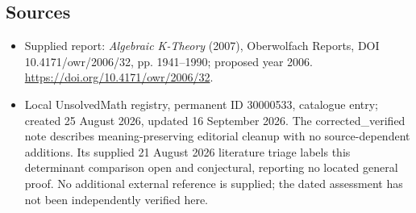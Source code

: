 \documentclass[11pt]{article}
\begin{document}
\subsection{Sources}
\begin{itemize}
\item Supplied report: \emph{Algebraic K-Theory} (2007), Oberwolfach Reports, DOI 10.4171/owr/2006/32, pp. 1941--1990; proposed year 2006. \url{https://doi.org/10.4171/owr/2006/32}.
\item Local UnsolvedMath registry, permanent ID 30000533, catalogue entry; created 25 August 2026, updated 16 September 2026. The corrected\_verified note describes meaning-preserving editorial cleanup with no source-dependent additions. Its supplied 21 August 2026 literature triage labels this determinant comparison open and conjectural, reporting no located general proof. No additional external reference is supplied; the dated assessment has not been independently verified here.
\end{itemize}
\end{document}
